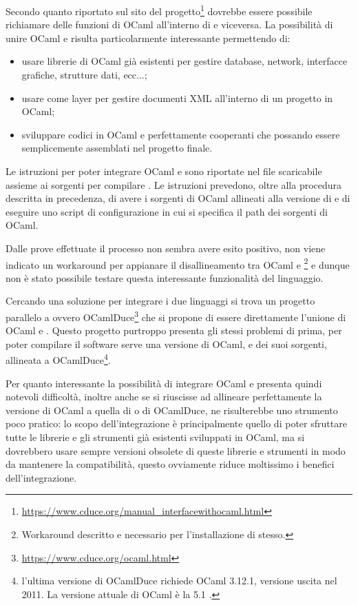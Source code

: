 Secondo quanto riportato sul sito del progetto\footnote{\url{https://www.cduce.org/manual_interfacewithocaml.html}} dovrebbe essere possibile richiamare delle funzioni di OCaml all'interno di \cduce e viceversa. La possibilità di unire OCaml e \cduce risulta particolarmente interessante permettendo di:
\begin{itemize}
	\item usare librerie di OCaml già esistenti per gestire database, network, interfacce grafiche, strutture dati, ecc...;
	\item usare \cduce come layer per gestire documenti XML all'interno di un progetto in OCaml;
	\item sviluppare codici in OCaml e \cduce perfettamente cooperanti che possando essere semplicemente assemblati nel progetto finale.
\end{itemize} 

Le istruzioni per poter integrare OCaml e \cduce sono riportate nel file  scaricabile assieme ai sorgenti per compilare \cduce. Le istruzioni prevedono, oltre alla procedura descritta in precedenza, di avere i sorgenti di OCaml allineati alla versione di \cduce e di eseguire uno script di configurazione in cui si specifica il path dei sorgenti di OCaml.

Dalle prove effettuate il processo non sembra avere esito positivo, non viene indicato un workaround per appianare il disallineamento tra OCaml e \cduce\footnote{Workaround descritto e necessario per l'installazione di \cduce stesso.} e dunque non è stato possibile testare questa interessante funzionalità del linguaggio.

Cercando una soluzione per integrare i due linguaggi si trova un progetto parallelo a \cduce ovvero OCamlDuce\footnote{\url{https://www.cduce.org/ocaml.html}} che si propone di essere direttamente l'unione di OCaml e \cduce. Questo progetto purtroppo presenta gli stessi problemi di prima, per poter compilare il software serve una versione di OCaml, e dei suoi sorgenti, allineata a OCamlDuce\footnote{l'ultima versione di OCamlDuce richiede OCaml 3.12.1, versione uscita nel 2011. La versione attuale di OCaml è la 5.1 .}.

Per quanto interessante la possibilità di integrare OCaml e \cduce presenta quindi notevoli difficoltà, inoltre anche se si riuscisse ad allineare perfettamente la versione di OCaml a quella di \cduce o di OCamlDuce, ne risulterebbe uno strumento poco pratico: lo scopo dell'integrazione è principalmente quello di poter sfruttare tutte le librerie e gli strumenti già esistenti sviluppati in OCaml, ma si dovrebbero usare sempre versioni obsolete di queste librerie e strumenti in modo da mantenere la compatibilità, questo ovviamente riduce moltissimo i benefici dell'integrazione.

